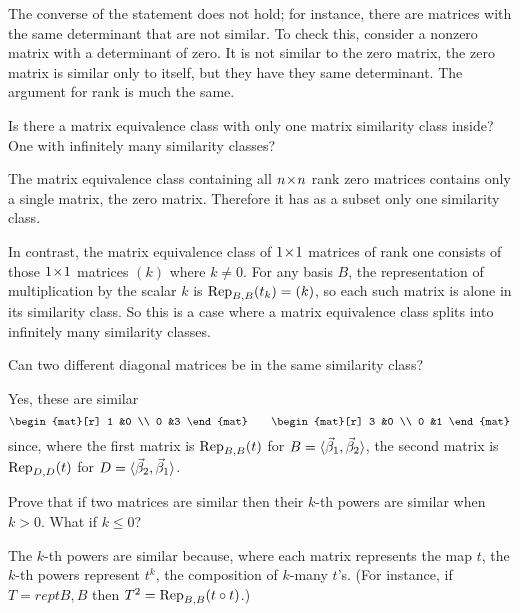 \begin{exercises}
\begin{answer}
       The converse of the statement does not hold; 
       for instance,
       there are matrices with the same determinant that are not similar.
       To check this, consider a nonzero matrix with a
       determinant of zero.
       It is not similar to the zero matrix, the zero matrix is similar
       only to itself, but they have they same determinant. 
       The argument for rank is much the same. 
     \end{answer}
  \item 
    Is there a matrix equivalence class with only one matrix similarity
    class inside?
    One with infinitely many similarity classes?
    \begin{answer}
      The matrix equivalence class containing all \( \nbyn{n} \) rank
      zero matrices contains only a single matrix, the zero matrix.
      Therefore it has as a subset only one similarity class.

      In contrast, the matrix equivalence class of \( \nbyn{1} \) matrices
      of rank one consists of those 
      $\nbyn{1}$ matrices \( (k) \) where \( k\neq 0 \).
      For any basis \( B \), the representation
      of multiplication by the scalar \( k \)
      is \( \rep{t_k}{B,B}=(k) \),
      so each such matrix is alone in its similarity class.
      So this is a case where a matrix equivalence class splits into
      infinitely many similarity classes.  
     \end{answer}
  \item 
    Can two different diagonal matrices be in the same similarity class?
    \begin{answer}
      Yes, these are similar
      \begin{equation*}
         \begin{mat}[r]
           1  &0  \\
           0  &3
         \end{mat}
         \qquad
         \begin{mat}[r]
           3  &0  \\
           0  &1
         \end{mat}
      \end{equation*}
      since, where the first matrix is $\rep{t}{B,B}$ for 
      $B=\sequence{\vec{\beta}_1,\vec{\beta}_2}$, 
      the second matrix is $\rep{t}{D,D}$ for 
      $D=\sequence{\vec{\beta}_2,\vec{\beta}_1}$.
     \end{answer}
  \recommended \item
    Prove that if two matrices are similar then their \( k \)-th powers
    are similar when \( k>0 \).
    What if \( k\leq 0 \)?
    \begin{answer}
      The \( k \)-th powers are similar because, where each matrix represents
      the map $t$, the $k$-th powers represent
      \( t^k \), the composition of $k$-many $t$'s.
      (For instance, if $T=rep{t}{B,B}$ then $T^2=\rep{\composed{t}{t}}{B,B}$.)


\end{answer}
\end{exercises}
